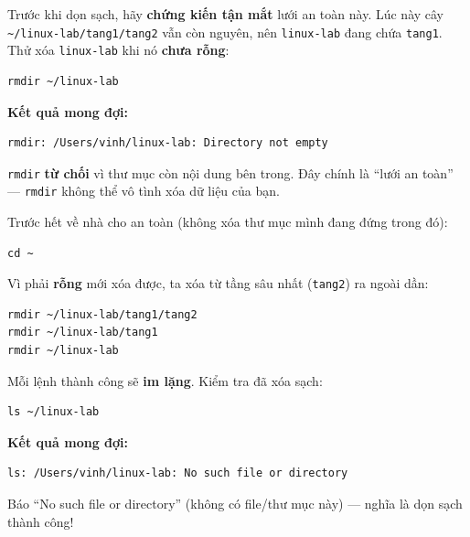 \documentclass[12pt,a4paper]{article}
\newcommand{\hm}{\textasciitilde{}}
\begin{document}
\begin{labbox}[title={Bước 7 --- Thử ``lưới an toàn'' của \texttt{rmdir} TRƯỚC khi dọn}]
Trước khi dọn sạch, hãy \textbf{chứng kiến tận mắt} lưới an toàn này. Lúc này cây \texttt{\hm/linux-lab/tang1/tang2} vẫn còn nguyên, nên \texttt{linux-lab} đang chứa \texttt{tang1}. Thử xóa \texttt{linux-lab} khi nó \textbf{chưa rỗng}:
\begin{codebox}
\begin{verbatim}
rmdir ~/linux-lab
\end{verbatim}
\end{codebox}
\textbf{Kết quả mong đợi:}
\begin{codebox}
\begin{verbatim}
rmdir: /Users/vinh/linux-lab: Directory not empty
\end{verbatim}
\end{codebox}
\texttt{rmdir} \textbf{từ chối} vì thư mục còn nội dung bên trong. Đây chính là ``lưới an toàn'' --- \texttt{rmdir} không thể vô tình xóa dữ liệu của bạn.
\end{labbox}

\begin{labbox}[title={Bước 8 --- Dọn sân tập đúng cách (xóa từ trong ra ngoài)}]
Trước hết về nhà cho an toàn (không xóa thư mục mình đang đứng trong đó):
\begin{codebox}
\begin{verbatim}
cd ~
\end{verbatim}
\end{codebox}
Vì phải \textbf{rỗng} mới xóa được, ta xóa từ tầng sâu nhất (\texttt{tang2}) ra ngoài dần:
\begin{codebox}
\begin{verbatim}
rmdir ~/linux-lab/tang1/tang2
rmdir ~/linux-lab/tang1
rmdir ~/linux-lab
\end{verbatim}
\end{codebox}
Mỗi lệnh thành công sẽ \textbf{im lặng}. Kiểm tra đã xóa sạch:
\begin{codebox}
\begin{verbatim}
ls ~/linux-lab
\end{verbatim}
\end{codebox}
\textbf{Kết quả mong đợi:}
\begin{codebox}
\begin{verbatim}
ls: /Users/vinh/linux-lab: No such file or directory
\end{verbatim}
\end{codebox}
Báo ``No such file or directory'' (không có file/thư mục này) --- nghĩa là dọn sạch thành công!
\end{labbox}
\end{document}
